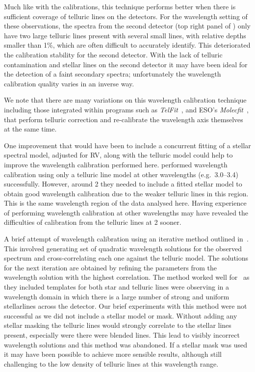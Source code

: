 Much like with the \thar{} calibrations, this technique performs better when there is sufficient coverage of telluric lines on the detectors. For the wavelength setting of these observations, the spectra from the second detector (top right panel of ) only have two large telluric lines present with several small lines, with relative depths smaller than 1\%, which are often difficult to accurately identify. This deteriorated the calibration stability for the second detector. With the lack of telluric contamination and stellar lines on the second detector it may have been ideal for the detection of a faint secondary spectra; unfortunately the wavelength calibration quality varies in an inverse way.


We note that there are many variations on this wavelength calibration technique including those integrated within programs such as \emph{TelFit}~\citet{gullikson_correcting_2014}, and {ESO}'s \emph{Molecfit}~\citet{smette_molecfit_2015}, that perform telluric correction and re-calibrate the wavelength axis themselves at the same time.

One improvement that would have been to include a concurrent fitting of a stellar spectral model, adjusted for {RV}, along with the telluric model could help to improve the wavelength calibration performed here. \citet{piskorz_evidence_2016} performed wavelength calibration using only a telluric line model at other \nir{} wavelengths {\red{} (e.g.\ 3.0--3.4\um{})} successfully. However, around 2\um{} they needed to include a fitted stellar model to obtain good wavelength calibration due to the weaker telluric lines in this region. This is the same wavelength region of the data analysed here. Having experience of performing wavelength calibration at other wavelengths may have revealed the difficulties of calibration from the telluric lines at 2\um{} sooner.

A brief attempt of wavelength calibration using an iterative method outlined in~\cite{brogi_rotation_2016}. This involved generating set of quadratic wavelength solutions for the observed spectrum and cross-correlating each one against the telluric model. The solutions for the next iteration are obtained by refining the parameters from the wavelength solution with the highest correlation. The method worked well for~\citet{brogi_rotation_2016} as they included templates for both star and telluric lines were observing in a wavelength domain in which there is a large number of strong and uniform stellarlines across the detector.
Our brief experiments with this method were not successful as we did not include a stellar model or mask. Without adding any stellar masking the telluric lines would strongly correlate to the stellar lines present, especially were there were blended lines. This lead to visibly incorrect wavelength solutions and this method was abandoned. If a stellar mask was used it may have been possible to achieve more sensible results, although still challenging to the low density of telluric lines at this wavelength range.


